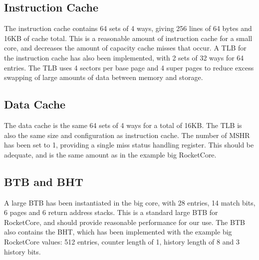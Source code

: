 \subsection{Instruction Cache}
The instruction cache contains 64 sets of 4 ways, giving 256 lines of 64 bytes and 16KB of cache total. This is a reasonable amount of instruction cache for a small core, and decreases the amount of capacity cache misses that occur. A TLB for the instruction cache has also been implemented, with 2 sets of 32 ways for 64 entries. The TLB uses 4 sectors per base page and 4 super pages to reduce excess swapping of large amounts of data between memory and storage.

\subsection{Data Cache}
The data cache is the same 64 sets of 4 ways for a total of 16KB. The TLB is also the same size and configuration as instruction cache. The number of MSHR has been set to 1, providing a single miss status handling register. This should be adequate, and is the same amount as in the example big RocketCore.

\subsection{BTB and BHT}
A large BTB has been instantiated in the big core, with 28 entries, 14 match bits, 6 pages and 6 return address stacks. This is a standard large BTB for RocketCore, and should provide reasonable performance for our use. The BTB also contains the BHT, which has been implemented with the example big RocketCore values: 512 entries, counter length of 1, history length of 8 and 3 history bits.

